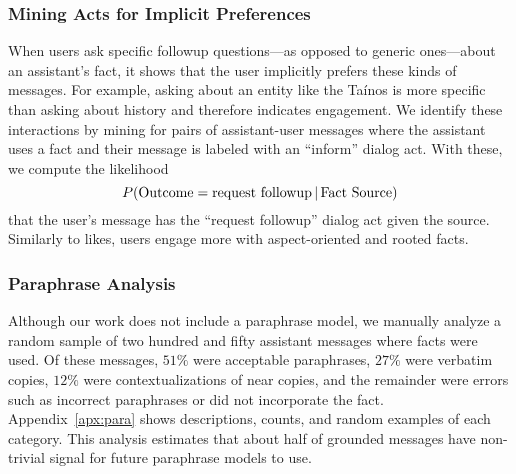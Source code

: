 \subsubsection{Mining Acts for Implicit Preferences}
When users ask specific followup questions---as opposed to generic ones---about an assistant's fact, it shows that the user implicitly prefers these kinds of messages.
For example, asking about an entity like the Ta\'inos is more specific than asking about history and therefore indicates engagement.
We identify these interactions by mining for pairs of assistant-user messages where the assistant uses a fact and their message is labeled with an ``inform'' dialog act.
With these, we compute the likelihood
$$P(\text{Outcome}=\text{request\ followup}\g\text{Fact Source})$$
that the user's message has the ``request followup'' dialog act given the source.
Similarly to likes, users engage more with aspect-oriented and rooted facts.

\subsubsection{Paraphrase Analysis}
\label{sec:para-analysis}
Although our work does not include a paraphrase model, we manually analyze a random sample of two hundred and fifty assistant messages where facts were used. %
Of these messages, $51\%$ were acceptable paraphrases, $27\%$ were verbatim copies, $12\%$ were contextualizations of near copies, and the remainder were errors such as incorrect paraphrases or did not incorporate the fact.
Appendix~\ref{apx:para} shows descriptions, counts, and random examples of each category.
This analysis estimates that about half of grounded messages have non-trivial signal for future paraphrase models to use.
